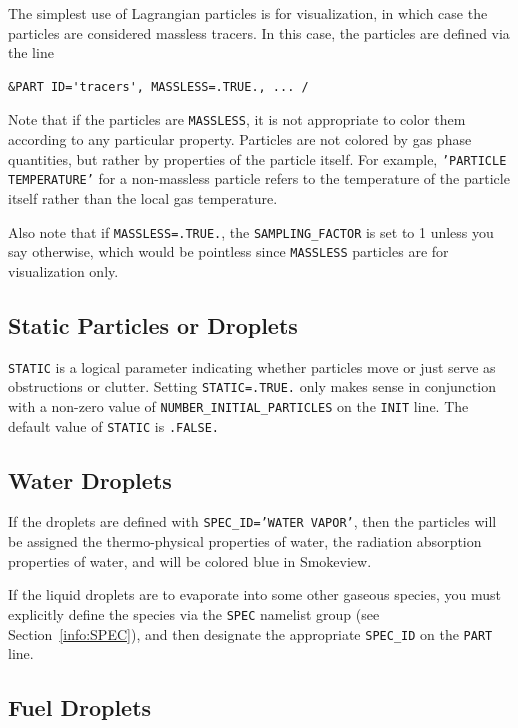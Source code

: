 \documentclass[11pt]{book}
\newcommand{\ct}{\tt\small}
\begin{document}
The simplest use of Lagrangian particles is for visualization, in which case the
particles are considered massless tracers. In this case, the particles are
defined via the line

\footnotesize
\begin{verbatim}
&PART ID='tracers', MASSLESS=.TRUE., ... /
\end{verbatim}
\normalsize

\noindent
Note that if the particles are {\ct MASSLESS}, it is not appropriate to color them according to any particular property.
Particles are not colored by gas phase quantities, but rather by properties of the particle itself. For example,
{\ct 'PARTICLE TEMPERATURE'} for a non-massless particle refers to the temperature of the particle itself
rather than the local gas temperature.

Also note that if {\ct MASSLESS=.TRUE.}, the {\ct SAMPLING\_FACTOR} is set to 1 unless you say otherwise, which would be pointless
since {\ct MASSLESS} particles are for visualization only.


\subsection{Static Particles or Droplets}
\label{info:STATIC}

{\ct STATIC} is a logical parameter indicating whether particles move or just serve
as obstructions or clutter. Setting {\ct STATIC=.TRUE.} only makes sense in conjunction with a non-zero value of
{\ct NUMBER\_INITIAL\_PARTICLES} on the {\ct INIT} line. The default value of {\ct STATIC} is {\ct .FALSE.}


\subsection{Water Droplets}

If the droplets are defined with {\ct SPEC\_ID='WATER VAPOR'}, then the particles will be assigned the thermo-physical properties of water,
the radiation absorption properties of water, and will be colored blue in Smokeview.

If the liquid droplets are to evaporate into some other gaseous species, you must explicitly define the species via the {\ct SPEC} namelist group (see Section~\ref{info:SPEC}), and then
designate the appropriate {\ct SPEC\_ID} on the {\ct PART} line.

\subsection{Fuel Droplets}
\label{info:fuel_droplets}
\end{document}
